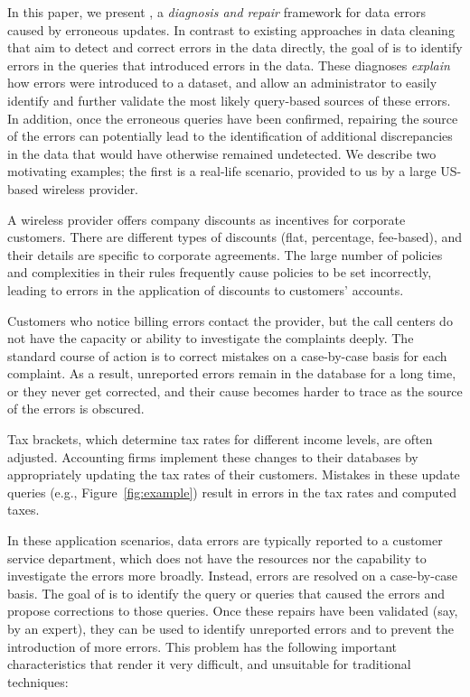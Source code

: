 In this paper, we present \sys, a \emph{diagnosis and repair} framework for data errors
caused by erroneous updates. In contrast to existing approaches in data
cleaning that aim to detect and correct errors in the data directly, the goal
of \sys is to identify errors in the queries that introduced errors in the
data. These diagnoses \emph{explain} how errors were introduced to a
dataset, and allow an administrator to easily identify and further validate the most likely query-based sources of these errors. 
In addition, once the erroneous queries have been confirmed, repairing the source of the errors
can potentially lead to the identification of additional discrepancies in
the data that would have otherwise remained undetected.  
We describe two motivating examples; the first is a real-life scenario, provided to us by a large US-based wireless provider.
% 
\begin{example}\label{ex:telco}

A wireless provider offers company discounts as incentives for
corporate customers. There are different types of discounts (flat, percentage,
fee-based), and their details are specific to corporate agreements. The large
number of policies and complexities in their rules frequently cause policies
to be set incorrectly, leading to errors in the application of discounts to
customers' accounts.

Customers who notice billing errors contact the provider, but the call centers
do not have the capacity or ability to investigate the complaints deeply. The
standard course of action is to correct mistakes on a case-by-case
basis for each complaint. As a result, unreported errors remain in the
database for a long time, or they never get corrected, and their cause becomes
harder to trace as the source of the errors is obscured.

\end{example}
% 
\begin{example}\label{ex:taxes}
    
Tax brackets, which determine tax rates for different income levels, are
often adjusted. Accounting firms implement these changes to their
databases by appropriately updating the tax rates of their customers. Mistakes
in these update queries (e.g., Figure~\ref{fig:example}) result in errors in
the tax rates and computed taxes. 

\end{example}
% 
In these application scenarios, data errors are typically reported to
a customer service department, which does not have the resources nor
the capability to investigate the errors more broadly. Instead, errors
are resolved on a case-by-case basis. The goal of \sys is to identify
the query or queries that caused the errors and propose corrections to
those queries.  Once these repairs have been validated (say, by an expert), they can be used to identify unreported
errors and to prevent the introduction of more errors. This problem
has the following important characteristics that render it very difficult, and unsuitable for traditional
techniques:


